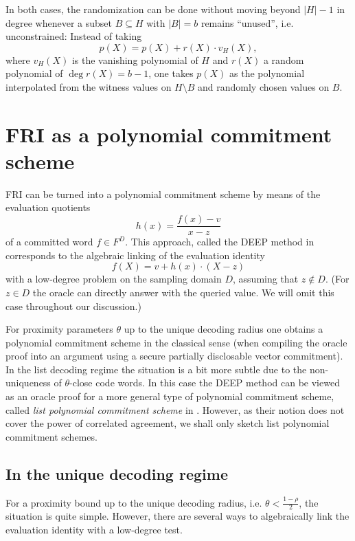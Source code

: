 \documentclass[11pt]{article}
\theoremstyle{definition}
\theoremstyle{remark}
\begin{document}
In both cases, the randomization can be done without moving beyond $|H|-1$ in degree whenever a subset $B\subseteq H$ with $|B|=b$ remains ``unused'', i.e. unconstrained: 
Instead of taking 
\[
p(X)= p(X) + r(X)\cdot v_H(X),
\]
where $v_H(X)$ is the vanishing polynomial of $H$ and $r(X)$ a random polynomial of $\deg r(X)= b - 1$, one takes $p(X)$ as the polynomial interpolated from the witness values on $H\setminus B$ and randomly chosen values on $B$.


\section{FRI as a polynomial commitment scheme}
\label{ch:Polycommit}

FRI can be turned into a polynomial commitment scheme by means of the evaluation quotients
\begin{equation*}
h(x)=\frac{f(x)-v}{x-z}
\end{equation*}
of a committed word $f\in F^D$. 
This approach, called the DEEP method in \cite{DEEPFRI}  corresponds to the algebraic linking of the evaluation identity
\begin{equation*}
f(X) = v + h(x)\cdot (X-z)
\end{equation*}
with a low-degree problem on the sampling domain $D$, assuming that $z\notin D$. 
(For $z\in D$ the oracle can directly answer with the queried value. We will omit this case throughout our discussion.)

For proximity parameters $\theta$ up to the unique decoding radius one obtains a polynomial commitment scheme in the classical sense (when compiling the oracle proof into an argument using a secure partially disclosable vector commitment). 
In the list decoding regime the situation is a bit more subtle due to the non-uniqueness of $\theta$-close code words. 
In this case the DEEP method can be viewed as an oracle proof for a more general type of polynomial commitment scheme, called \textit{list polynomial commitment scheme} in \cite{Redshift}. 
However, as their notion does not cover the power of correlated agreement, we shall only sketch list polynomial commitment schemes.%

\subsection{In the unique decoding regime}
For a proximity bound up to the unique decoding radius, i.e. $\theta < \frac{1-\rho}{2}$, the situation is quite simple. 
However, there are several ways to algebraically link the evaluation identity with a low-degree test. 
\end{document}

